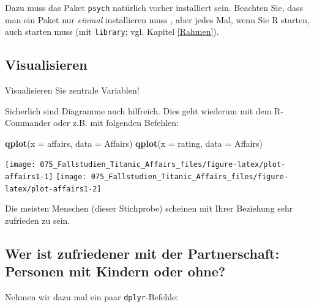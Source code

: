 \documentclass[12pt,ngerman,]{book}
\makeatletter
\newenvironment{Shaded}{\begin{snugshade}}{\end{snugshade}}
\newcommand{\KeywordTok}[1]{\textcolor[rgb]{0.13,0.29,0.53}{\textbf{#1}}}
\newcommand{\DataTypeTok}[1]{\textcolor[rgb]{0.13,0.29,0.53}{#1}}
\newcommand{\StringTok}[1]{\textcolor[rgb]{0.31,0.60,0.02}{#1}}
\newcommand{\CommentTok}[1]{\textcolor[rgb]{0.56,0.35,0.01}{\textit{#1}}}
\newcommand{\OperatorTok}[1]{\textcolor[rgb]{0.81,0.36,0.00}{\textbf{#1}}}
\newcommand{\NormalTok}[1]{#1}
\newenvironment{kframe}{%
\medskip{}
\setlength{\fboxsep}{.8em}
 \def\at@end@of@kframe{}%
 \ifinner\ifhmode%
  \def\at@end@of@kframe{\end{minipage}}%
  \begin{minipage}{\columnwidth}%
 \fi\fi%
 \def\FrameCommand##1{\hskip\@totalleftmargin \hskip-\fboxsep
 \colorbox{shadecolor}{##1}\hskip-\fboxsep
     \hskip-\linewidth \hskip-\@totalleftmargin \hskip\columnwidth}%
 \MakeFramed {\advance\hsize-\width
   \@totalleftmargin\z@ \linewidth\hsize
   \@setminipage}}%
 {\par\unskip\endMakeFramed%
 \at@end@of@kframe}
\renewenvironment{Shaded}{\begin{kframe}}{\end{kframe}}
\theoremstyle{definition}
\theoremstyle{definition}
\theoremstyle{remark}
\makeatother
\begin{document}
Dazu muss das Paket \texttt{psych} natürlich vorher installiert sein.
Beachten Sie, dass man ein Paket nur \emph{einmal} installieren muss ,
aber jedes Mal, wenn Sie R starten, auch starten muss (mit
\texttt{library}; vgl. Kapitel \ref{Rahmen}).

\subsection{Visualisieren}\label{visualisieren}

Visualisieren Sie zentrale Variablen!

Sicherlich sind Diagramme auch hilfreich. Dies geht wiederum mit dem
R-Commander oder z.B. mit folgenden Befehlen:

\begin{Shaded}
\begin{Highlighting}[]
\KeywordTok{qplot}\NormalTok{(}\DataTypeTok{x =}\NormalTok{ affairs, }\DataTypeTok{data =}\NormalTok{ Affairs)}
\KeywordTok{qplot}\NormalTok{(}\DataTypeTok{x =}\NormalTok{ rating, }\DataTypeTok{data =}\NormalTok{ Affairs)}
\end{Highlighting}
\end{Shaded}

\begin{center}\texttt{[image: 075\_Fallstudien\_Titanic\_Affairs\_files/figure-latex/plot-affairs1-1]} \texttt{[image: 075\_Fallstudien\_Titanic\_Affairs\_files/figure-latex/plot-affairs1-2]} \end{center}

Die meisten Menschen (dieser Stichprobe) scheinen mit Ihrer Beziehung
sehr zufrieden zu sein.

\subsection{Wer ist zufriedener mit der Partnerschaft: Personen mit
Kindern oder
ohne?}\label{wer-ist-zufriedener-mit-der-partnerschaft-personen-mit-kindern-oder-ohne}

Nehmen wir dazu mal ein paar \texttt{dplyr}-Befehle:

\begin{Shaded}
\end{Shaded}
\end{document}
